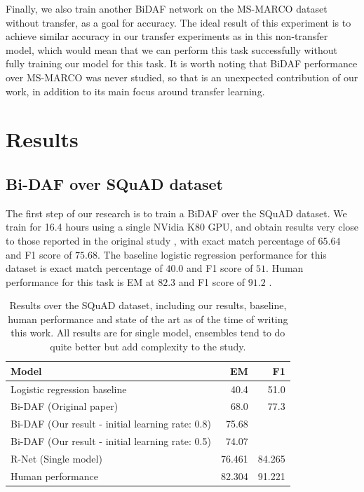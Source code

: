 \documentclass[11pt,a4paper]{article}
\begin{document}
Finally, we also train another BiDAF network on the MS-MARCO dataset without transfer, as a goal for accuracy. The ideal result of this experiment is to achieve similar accuracy in our transfer experiments as in this non-transfer model, which would mean that we can perform this task successfully without fully training our model for this task. It is worth noting that BiDAF performance over MS-MARCO was never studied, so that is an unexpected contribution of our work, in addition to its main focus around transfer learning.

\section{Results}
\label{sec:results}

\subsection{Bi-DAF over SQuAD dataset}

The first step of our research is to train a BiDAF over the SQuAD dataset. We train for 16.4 hours using a single NVidia K80 GPU, and obtain results very close to those reported in the original study \cite{bidaf:2017}, with exact match percentage of $65.64$ and F1 score of $75.68$. The baseline logistic regression performance for this dataset is exact match percentage of $40.0$ and F1 score of $51$. Human performance for this task is EM at $82.3$ and F1 score of $91.2$ \cite{squad:2016} \cite{rnet}.

\begin{table}[t!]
\begin{center}
\begin{tabular}{l|r|r}
\hline \bf Model & \bf EM & \bf F1 \\ \hline
Logistic regression baseline  \cite{squad:2016} & 40.4 & 51.0 \\
Bi-DAF (Original paper) & 68.0 & 77.3 \\
Bi-DAF (Our result - initial learning rate: 0.8) & 75.68 & \\
Bi-DAF (Our result - initial learning rate: 0.5) & 74.07 & \\
R-Net (Single model) & 76.461 & 84.265 \\
Human performance \cite{squad:2016} & 82.304 & 91.221 \\
\end{tabular}
\end{center}
\caption{\label{squad-table} Results over the SQuAD dataset, including our results, baseline, human performance and state of the art as of the time of writing this work. All results are for single model, ensembles tend to do quite better but add complexity to the study.}
\end{table}
\end{document}
